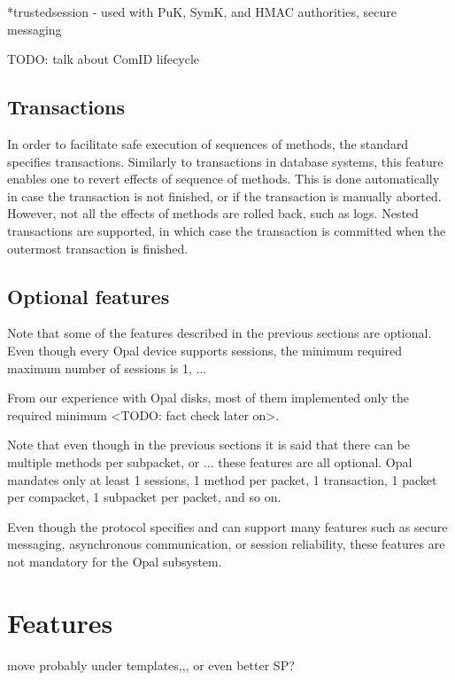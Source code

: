 *trustedsession - used with PuK, SymK, and HMAC authorities, secure messaging



TODO: talk about ComID lifecycle


\subsection{Transactions}

In order to facilitate safe execution of sequences of methods, the standard specifies transactions. Similarly to transactions in database systems, this feature enables one to revert effects of sequence of methods. This is done automatically in case the transaction is not finished, or if the transaction is manually aborted. However, not all the effects of methods are rolled back, such as logs. Nested transactions are supported, in which case the transaction is committed when the outermost transaction is finished.


\subsection{Optional features}

Note that some of the features described in the previous sections are optional. Even though every Opal device supports sessions, the minimum required maximum number of sessions is 1, ...

From our experience with Opal disks, most of them implemented only the required minimum <TODO: fact check later on>.

Note that even though in the previous sections it is said that there can be multiple methods per subpacket, or ... these features are all optional. Opal mandates only at least 1 sessions, 1 method per packet, 1 transaction, 1 packet per compacket, 1 subpacket per packet, and so on.





Even though the protocol specifies and can support many features such as secure messaging, asynchronous communication, or session reliability, these features are not mandatory for the Opal subsystem.

\section{Features}

move probably under templates,,, or even better SP?

